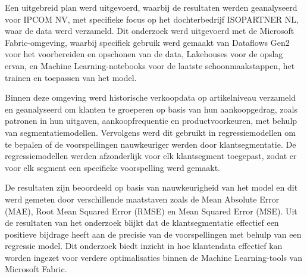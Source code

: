 \vspace{1em} 

Een uitgebreid plan werd uitgevoerd, waarbij de resultaten werden geanalyseerd voor IPCOM NV, met specifieke focus op het dochterbedrijf ISOPARTNER NL, waar de data werd verzameld. Dit onderzoek werd uitgevoerd met de Microsoft Fabric-omgeving, waarbij specifiek gebruik werd gemaakt van Dataflows Gen2 voor het voorbereiden en opschonen van de data, Lakehouses voor de opslag ervan, en Machine Learning-notebooks voor de laatste schoonmaakstappen, het trainen en toepassen van het model.

\vspace{1em}

Binnen deze omgeving werd historische verkoopdata op artikelniveau verzameld en geanalyseerd om klanten te groeperen op basis van hun aankoopgedrag, zoals patronen in hun uitgaven, aankoopfrequentie en productvoorkeuren, met behulp van segmentatiemodellen. Vervolgens werd dit gebruikt in regressiemodellen om te bepalen of de voorspellingen nauwkeuriger werden door klantsegmentatie. De regressiemodellen werden afzonderlijk voor elk klantsegment toegepast, zodat er voor elk segment een specifieke voorspelling werd gemaakt.

\vspace{1em}

De resultaten zijn beoordeeld op basis van nauwkeurigheid van het model en dit werd gemeten door verschillende maatstaven zoals de Mean Absolute Error (MAE), Root Mean Squared Error (RMSE) en  Mean Squared Error (MSE). Uit de resultaten van het onderzoek blijkt dat de klantsegmentatie effectief een positieve bijdrage heeft aan de precisie van de voorspellingen met behulp van een regressie model. Dit onderzoek biedt inzicht in hoe klantendata effectief kan worden ingezet voor verdere optimalisaties binnen de Machine Learning-tools van Microsoft Fabric.

